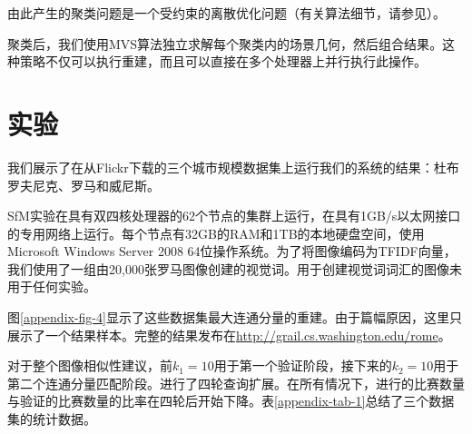 \begin{translation}
由此产生的聚类问题是一个受约束的离散优化问题（有关算法细节，请参见\citet{furukawa2010towards}）。

聚类后，我们使用MVS算法独立求解每个聚类内的场景几何，然后组合结果\cite{furukawa2010towards}。这种策略不仅可以执行重建，而且可以直接在多个处理器上并行执行此操作。

\section{实验}
我们展示了在从Flickr下载的三个城市规模数据集上运行我们的系统的结果：杜布罗夫尼克、罗马和威尼斯。

SfM实验在具有双四核处理器的62个节点的集群上运行，在具有1GB/s以太网接口的专用网络上运行。每个节点有32GB的RAM和1TB的本地硬盘空间，使用Microsoft Windows Server 2008 64位操作系统。为了将图像编码为TFIDF向量，我们使用了一组由20,000张罗马图像创建的视觉词。用于创建视觉词词汇的图像未用于任何实验。

图\ref{appendix-fig-4}显示了这些数据集最大连通分量的重建。由于篇幅原因，这里只展示了一个结果样本。完整的结果发布在\href{http://grail.cs.washington.edu/rome}{http://grail.cs.washington.edu/rome}。

对于整个图像相似性建议，前$k_1=10$用于第一个验证阶段，接下来的$k_2=10$用于第二个连通分量匹配阶段。进行了四轮查询扩展。在所有情况下，进行的比赛数量与验证的比赛数量的比率在四轮后开始下降。表\ref{appendix-tab-1}总结了三个数据集的统计数据。
\begin{table}
	\centering
	\caption{三个城市的匹配和SfM统计}
	\label{appendix-tab-1}
\end{table}


\end{translation}
